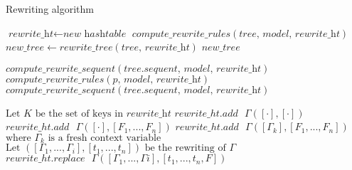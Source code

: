 \documentclass{article}
\begin{document}
\begin{algorithm}
  \caption{Rewriting algorithm}
  \begin{algorithmic}[1]
    \State $\textit{rewrite\_ht} \gets \textit{new\ hashtable}$
    \State $\textit{compute\_rewrite\_rules}\left(\textit{tree, model, rewrite\_ht}\right)$
    \State $\textit{new\_tree} \gets \textit{rewrite\_tree}\left(\textit{tree, rewrite\_ht}\right)$
    \State \Return $\textit{new\_tree}$
    \EndFunction
    \State

     \State $\textit{compute\_rewrite\_sequent}\left(\textit{tree.sequent, model, rewrite\_ht}\right)$
    \Else
      \State $\textit{compute\_rewrite\_rules}\left(\textit{p, model, rewrite\_ht}\right)$
      \EndFor
      \State $\textit{compute\_rewrite\_sequent}\left(\textit{tree.sequent, model, rewrite\_ht}\right)$
    \EndIf
    \EndFunction
    \State
    
    \State $\text{Let } K \text{ be the set of keys in } \textit{rewrite\_ht}$
            \State $rewrite\_ht.add \text{ } \Gamma \left([\cdot], [\cdot]\right)$
          \EndIf
        \EndIf
              \State $rewrite\_ht.add \text{ } \Gamma \left([\cdot], [F_1, ..., F_n]\right)$
            \Else
              \State $rewrite\_ht.add \text{ } \Gamma \left([\Gamma_{k}], [F_1, ..., F_n]\right)$
              \State $\text{where } \Gamma_{k} \text{ is a fresh context variable}$
            \EndIf
          \Else
            \State $\text{Let } \left([\Gamma_{1}, ..., \Gamma_{i}], [t_{1}, ..., t_{n}]\right) \text{ be the rewriting of } \Gamma$
              \State $rewrite\_ht.replace \text{ } \Gamma \left([\Gamma_{1}, ..., \Gamma{i}], [t_{1}, ..., t_{n}, F]\right)$ 
            \EndIf
          \EndIf
        \EndIf
      \EndFor
  \end{algorithmic}
\end{algorithm}
\end{document}
